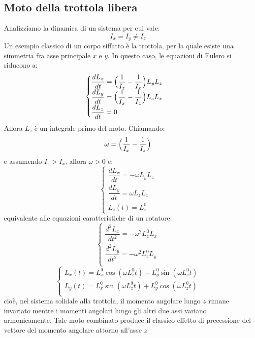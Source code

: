\documentclass[a4paper,openany]{article}
\begin{document}
	\subsection{Moto della trottola libera}
	Analizziamo la dinamica di un sistema per cui vale:
	$$
	I_x = I_y \neq I_z
	$$
	Un esempio classico di un corpo siffatto è la trottola, per la quale esiste una simmetria fra asse principale $x \mbox{ e }y$. In questo caso, le equazioni di Eulero si riducono a:
	\begin{equation}
		\begin{cases}
			\dfrac{dL_x}{dt} = \Bigl(\dfrac{1}{I_z}-\dfrac{1}{I_x}\Bigl) L_yL_z \\
			\dfrac{dL_y}{dt} = \Bigl(\dfrac{1}{I_x}-\dfrac{1}{I_z}\Bigl) L_zL_x \\
			\dfrac{dL_z}{dt} = 0
		\end{cases}
	\end{equation}
	Allora $L_z$ è un integrale primo del moto. Chiamando:
	$$
	\omega = \Bigl(\dfrac{1}{I_x}-\dfrac{1}{I_z}\Bigl)
	$$
	e assumendo $I_z > I_x$, allora $\omega > 0$ e:
	\begin{equation}
		\begin{cases}
			\dfrac{dL_x}{dt} = -\omega L_yL_z \\[6pt]
			
			\dfrac{dL_y}{dt} = \omega L_zL_x  \\
			
			L_z (t) = L_z^{0}
		\end{cases}
	\end{equation}
	equivalente alle equazioni caratteristiche di un rotatore: 
	\begin{equation}
		\begin{cases}
			\dfrac{d^2L_x}{dt^2} = -\omega^2 L_{z}^{0} L_x \\[6pt]
			\dfrac{d^2L_y}{dt^2} = -\omega^2 L_{z}^{0} L_y \\ 
		\end{cases}
	\end{equation}
	\begin{equation}
		\begin{cases}
			L_x(t) = L_x^0 \cos(\omega L_z^0 t) - L_y^0 \sin(\omega L_z^0 t)\\
			L_y(t) = L_x^0 \sin(\omega L_z^0 t) + L_y^0 \cos(\omega L_z^0 t) \\ 
		\end{cases}
	\end{equation}
	cioè, nel sistema solidale alla trottola, il momento angolare lungo $z$ rimane invariato mentre i momenti angolari lungo gli altri due assi variano armonicamente. Tale moto combinato produce il classico effetto di precessione del vettore del momento angolare attorno all'asse $z$
	
\end{document}
